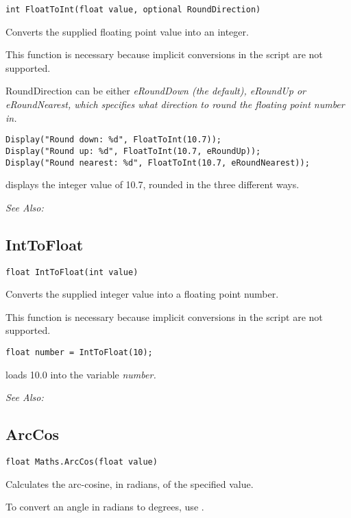 \begin{verbatim}
int FloatToInt(float value, optional RoundDirection)
\end{verbatim}
Converts the supplied floating point value into an integer.

This function is necessary because implicit conversions in the script are not supported.

RoundDirection can be either \it{eRoundDown} (the default), \it{eRoundUp} or \it{eRoundNearest},
which specifies what direction to round the floating point number in.

\begin{verbatim}
Display("Round down: %d", FloatToInt(10.7));
Display("Round up: %d", FloatToInt(10.7, eRoundUp));
Display("Round nearest: %d", FloatToInt(10.7, eRoundNearest));
\end{verbatim}
displays the integer value of 10.7, rounded in the three different ways.

\it{See Also:} 


\subsection{IntToFloat}\label{IntToFloat}%

\begin{verbatim}
float IntToFloat(int value)
\end{verbatim}
Converts the supplied integer value into a floating point number.

This function is necessary because implicit conversions in the script are not supported.

\begin{verbatim}
float number = IntToFloat(10);
\end{verbatim}
loads 10.0 into the variable \it{number}.

\it{See Also:} 


\subsection{ArcCos}\label{Maths.ArcCos}%

\begin{verbatim}
float Maths.ArcCos(float value)
\end{verbatim}
Calculates the arc-cosine, in radians, of the specified value.

To convert an angle in radians to degrees, use .

